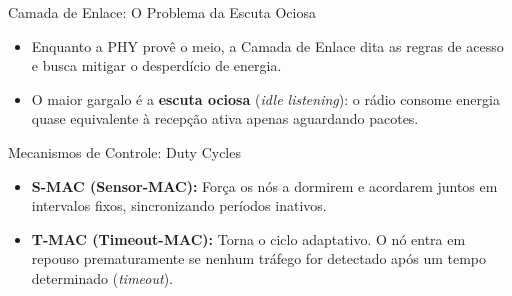 \begin{frame}{Camada de Enlace: O Problema da Escuta Ociosa}
    \begin{itemize}
        \item Enquanto a PHY provê o meio, a Camada de Enlace dita as regras de acesso e busca mitigar o desperdício de energia.   
        \item O maior gargalo é a \textbf{escuta ociosa} (\textit{idle listening}): o rádio consome energia quase equivalente à recepção ativa apenas aguardando pacotes.   
    \end{itemize}
    
    \vspace{0.3cm}
    
    \begin{exampleblock}{Mecanismos de Controle: Duty Cycles}
        \begin{itemize}
            \item \textbf{S-MAC (Sensor-MAC):} Força os nós a dormirem e acordarem juntos em intervalos fixos, sincronizando períodos inativos.   
            \item \textbf{T-MAC (Timeout-MAC):} Torna o ciclo adaptativo. O nó entra em repouso prematuramente se nenhum tráfego for detectado após um tempo determinado (\textit{timeout}).   
        \end{itemize}
    \end{exampleblock}
\end{frame}